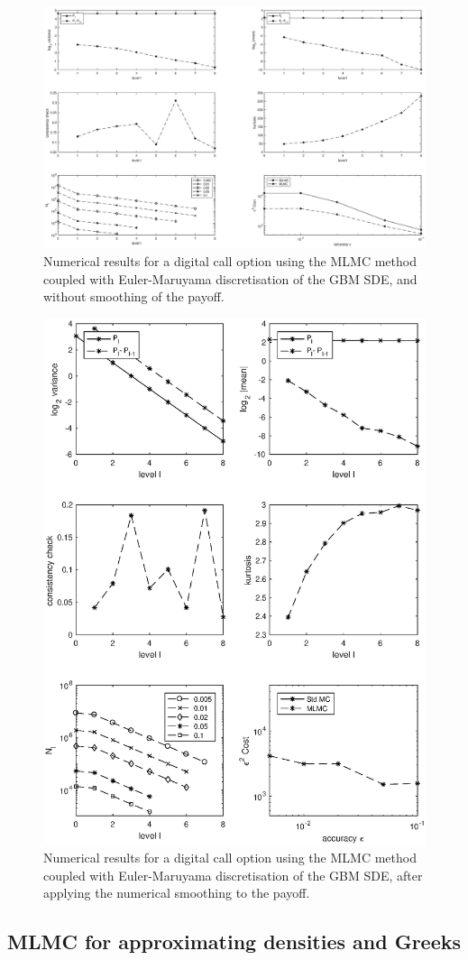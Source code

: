 \FloatBarrier
	\begin{figure}[h!]
\centering
\includegraphics[width=1\linewidth]{./figures/MLMC_binary_opt/euler_digital_without_smoothing}

\caption{Numerical results for a digital call option using the MLMC method coupled with Euler-Maruyama discretisation of the GBM SDE, and without smoothing of the payoff.}
\label{fig:euler_digital_without_smoothing}
\end{figure}

\FloatBarrier

\FloatBarrier
	\begin{figure}[h!]
\centering
\includegraphics[width=0.7\linewidth]{./figures/MLMC_binary_opt/digital_option_with_smoothing_L_0_2_steps}

\caption{Numerical results for a digital call option using the MLMC method coupled with Euler-Maruyama discretisation of the GBM SDE, after applying  the numerical smoothing to the payoff.}
\label{fig:euler_digital_with_smoothing}
\end{figure}

\FloatBarrier


\subsection{MLMC for approximating densities and Greeks}\label{sec: MLMC for approximating densities and greeks}

